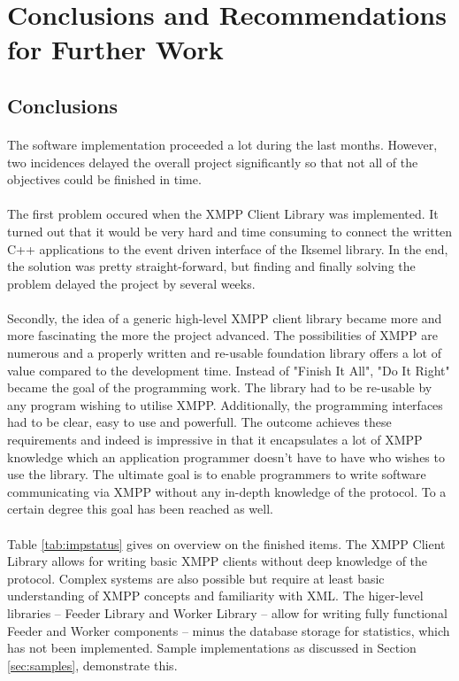 \section{Conclusions and Recommendations for Further Work}

\subsection{Conclusions}
\paragraph{}
The software implementation proceeded a lot during the last months. However, two incidences delayed the overall project significantly so that not all of the objectives could be finished in time.

\paragraph{}
The first problem occured when the XMPP Client Library was implemented. It turned out that it would be very hard and time consuming to connect the written C++ applications to the event driven interface of the Iksemel library. In the end, the solution was pretty straight-forward, but finding and finally solving the problem delayed the project by several weeks.

\paragraph{}
Secondly, the idea of a generic high-level XMPP client library became more and more fascinating the more the project advanced. The possibilities of XMPP are numerous and a properly written and re-usable foundation library offers a lot of value compared to the development time. Instead of "Finish It All", "Do It Right" became the goal of the programming work. The library had to be re-usable by any program wishing to utilise XMPP. Additionally, the programming interfaces had to be clear, easy to use and powerfull. The outcome achieves these requirements and indeed is impressive in that it encapsulates a lot of XMPP knowledge which an application programmer doesn't have to have who wishes to use the library. The ultimate goal is to enable programmers to write software communicating via XMPP without any in-depth knowledge of the protocol. To a certain degree this goal has been reached as well.

\paragraph{}
Table \ref{tab:impstatus} gives on overview on the finished items. The XMPP Client Library allows for writing basic XMPP clients without deep knowledge of the protocol. Complex systems are also possible but require at least basic understanding of XMPP concepts and familiarity with XML. The higer-level libraries -- Feeder Library and Worker Library -- allow for writing fully functional Feeder and Worker components -- minus the database storage for statistics, which has not been implemented. Sample implementations as discussed in Section \ref{sec:samples}, demonstrate this.

